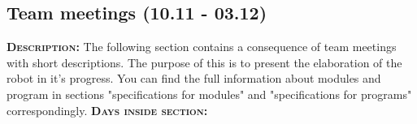 \subsection{Team meetings (10.11 - 03.12)}
	\textsc{\textbf{Description:}} The following section contains a consequence of team meetings with short descriptions. The purpose of this is to present the elaboration of the robot in it's progress. You can find the full information about modules and program in sections "specifications for modules" and "specifications for programs" correspondingly. \newline
	\textsc{\textbf{Days inside section:}}
	
